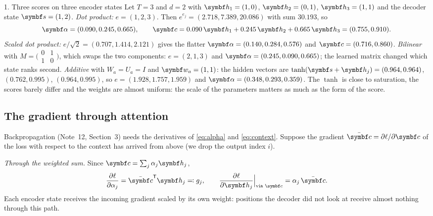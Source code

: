 \documentclass[11pt]{article}
\newcommand{\hv}{\vect{h}}
\newcommand{\sv}{\vect{s}}
\newcommand{\cv}{\vect{c}}
\newcommand{\valpha}{\vect{\alpha}}
\begin{document}
\begin{worked}{1. Three scores on three encoder states}
Let $T = 3$ and $d = 2$ with $\hv_1 = (1, 0)$, $\hv_2 = (0, 1)$, $\hv_3 = (1, 1)$ and the decoder state $\sv = (1, 2)$.
\emph{Dot product:} $e = (1, 2, 3)$. Then $e^{e_j} = (2.718, 7.389, 20.086)$ with sum $30.193$, so
\[
  \valpha = (0.090, 0.245, 0.665), \qquad \cv = 0.090\,\hv_1 + 0.245\,\hv_2 + 0.665\,\hv_3 = (0.755, 0.910) .
\]
\emph{Scaled dot product:} $e/\sqrt2 = (0.707, 1.414, 2.121)$ gives the flatter $\valpha = (0.140, 0.284, 0.576)$ and
$\cv = (0.716, 0.860)$.
\emph{Bilinear} with $M = \big(\begin{smallmatrix} 0 & 1 \\ 1 & 0 \end{smallmatrix}\big)$, which swaps the two
components: $e = (2, 1, 3)$ and $\valpha = (0.245, 0.090, 0.665)$; the learned matrix changed which state ranks second.
\emph{Additive} with $W_a = U_a = I$ and $\vect{w}_a = (1, 1)$: the hidden vectors are $\tanh(\sv + \hv_j) =
(0.964, 0.964)$, $(0.762, 0.995)$, $(0.964, 0.995)$, so $e = (1.928, 1.757, 1.959)$ and
$\valpha = (0.348, 0.293, 0.359)$. The $\tanh$ is close to saturation, the scores barely differ and the weights are almost
uniform: the scale of the parameters matters as much as the form of the score.
\end{worked}

\subsection{The gradient through attention}\label{sec:attgrad}

Backpropagation (Note~12, Section~3) needs the derivatives of \eqref{eq:alpha} and \eqref{eq:context}. Suppose the
gradient $\bar{\cv} = \partial\ell/\partial\cv$ of the loss with respect to the context has arrived from above (we drop the
output index $i$).

\emph{Through the weighted sum.} Since $\cv = \sum_j \alpha_j\hv_j$,
\begin{equation}\label{eq:gradvalue}
  \frac{\partial\ell}{\partial\alpha_j} = \bar{\cv}\T\hv_j \eqqcolon g_j, \qquad
  \frac{\partial\ell}{\partial\hv_j}\Big|_{\text{via }\cv} = \alpha_j\,\bar{\cv} .
\end{equation}
Each encoder state receives the incoming gradient scaled by its own weight: positions the decoder did not look at
receive almost nothing through this path.
\end{document}
